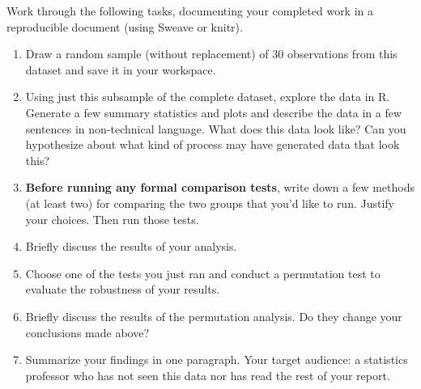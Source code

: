 \documentclass[11pt]{article}\usepackage{graphicx, color}
\begin{document}
Work through the following tasks, documenting your completed work in a reproducible document (using Sweave or knitr).
\begin{enumerate}
\item Draw a random sample (without replacement) of 30 observations from this dataset and save it in your workspace.
\item Using just this subsample of the complete dataset, explore the data in R. Generate a few summary statistics and plots and describe the data in a few sentences in non-technical language. What does this data look like? Can you hypothesize about what kind of process may have generated data that look this?
\item {\bf Before running any formal comparison tests}, write down a few methods (at least two) for comparing the two groups that you'd like to run. Justify your choices. Then run those tests.
\item Briefly discuss the results of your analysis.
\item Choose one of the tests you just ran and conduct a permutation test to evaluate the robustness of your results.
\item Briefly discuss the results of the permutation analysis. Do they change your conclusions made above?
\item Summarize your findings in one paragraph. Your target audience: a statistics professor who has not seen this data nor has read the rest of your report.
\end{enumerate}
\end{document}
